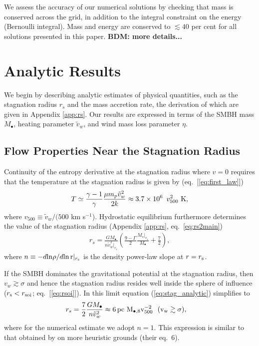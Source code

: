 \documentclass[usenatbib,fleqn]{mn2e}
\newcommand{\rs}{r_s}
\newcommand{\vw}{\tilde{v}_{w}}
\newcommand{\pc}{\rm pc}
\newcommand{\Mbh}[1][]{M_{\bullet#1}}
\newcommand{\Mbheight}{M_{\bullet,8}}
\begin{document}
We assess the accuracy of our numerical solutions by checking that mass is conserved across the grid, in addition to the integral constraint on the energy (Bernoulli integral).  Mass and energy are conserved to $\lesssim
40$ per cent for all solutions presented in this paper.  {\bf BDM:
  more details...}


\section{Analytic Results}
\label{sec:results}

We begin by describing analytic estimates of physical quantities, such as the stagnation radius $\rs$ and the mass accretion rate, the derivation of which are given in Appendix \ref{app:rs}.  Our results are expressed in terms of the SMBH mass $M_{\bullet}$, heating parameter $\tilde{v}_{w}$, and wind mass loss parameter $\eta$.

\subsection{Flow Properties Near the Stagnation Radius}

Continuity of the entropy derivative at the stagnation radius where $v = 0$ requires that the temperature at the stagnation radius is given by (eq.~[\ref{eq:first_law}])
\begin{align}
T \simeq \frac{\gamma-1}{\gamma}\frac{\mu m_p \tilde{v}_{w}^{2}}{2k} \approx 3.7
\times 10^6\ \, v_{500}^2 \,\,{\rm K},
\label{eq:Tanalytic}
\end{align}
where $v_{500} \equiv \tilde{v}_{w}/(500$ km s$^{-1}$).  Hydrostatic equilibrium furthermore determines the value of the stagnation radius (Appendix \ref{app:rs}, eq.~\ref{eq:rs2main})
\begin{align}
\rs=\frac{G \Mbh}{n \vw^{2}|_{\rs}}\left(\frac{9-\Gamma}{2} \frac{M_{\star}|_{\rs}}{\Mbh} +\frac{7}{2}\right),
\label{eq:stag_analytic}
\end{align}
where $n \equiv -d{\rm ln}\rho/d{\rm ln\,r}|_{r_{\rm s}}$ is the density power-law slope at $r = r_{\rm s}$.  

If the SMBH dominates the gravitational potential at the stagnation radius, then $v_{w} \gtrsim \sigma$ and hence the stagnation radius resides well inside the sphere of influence ($r_{\rm s} < r_{\rm soi}$; eq.~[\ref{eq:rsoi}]).  In this limit equation (\ref{eq:stag_analytic}) simplifies to
\begin{align}
  &\rs=\frac{7}{2}\frac{G \Mbh}{n \tilde{v}_{w}^{2}} \approx 6
 \, \pc \,\, \Mbheight v_{500}^{-2}\,\,\,\,(v_{\rm w} \gtrsim \sigma),
  \label{eq:stag_simple}
\end{align}
where for the numerical estimate we adopt $n = 1$.  This expression is similar to that obtained by \citet{Volonteri+11} on more heuristic grounds (their eq.~6).  
\end{document}

